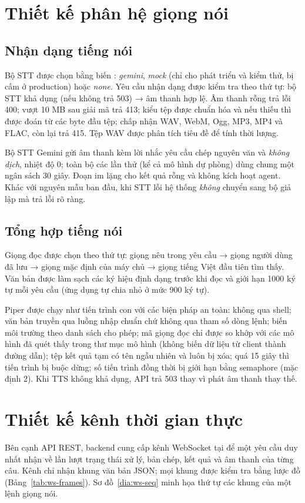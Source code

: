 \section{Thiết kế phân hệ giọng nói}
\subsection{Nhận dạng tiếng nói}
Bộ STT được chọn bằng biến : \textit{gemini}, \textit{mock} (chỉ cho phát triển và kiểm thử, bị cấm ở production) hoặc \textit{none}. Yêu cầu nhận dạng được kiểm tra theo thứ tự: bộ STT khả dụng (nếu không trả 503) → âm thanh hợp lệ. Âm thanh rỗng trả lỗi 400; vượt 10 MB sau giải mã trả 413; kiểu tệp được chuẩn hóa và nếu thiếu thì được đoán từ các byte đầu tệp; chấp nhận WAV, WebM, Ogg, MP3, MP4 và FLAC, còn lại trả 415. Tệp WAV được phân tích tiêu đề để tính thời lượng.

Bộ STT Gemini gửi âm thanh kèm lời nhắc yêu cầu chép nguyên văn và \textit{không dịch}, nhiệt độ 0; toàn bộ các lần thử (kể cả mô hình dự phòng) dùng chung một ngân sách 30 giây. Đoạn im lặng cho kết quả rỗng và không kích hoạt agent. Khác với nguyên mẫu ban đầu, khi STT lỗi hệ thống \textit{không} chuyển sang bộ giả lập mà trả lỗi rõ ràng.

\subsection{Tổng hợp tiếng nói}
Giọng đọc được chọn theo thứ tự: giọng nêu trong yêu cầu → giọng người dùng đã lưu → giọng mặc định của máy chủ → giọng tiếng Việt đầu tiên tìm thấy. Văn bản được làm sạch các ký hiệu định dạng trước khi đọc và giới hạn 1000 ký tự mỗi yêu cầu (ứng dụng tự chia nhỏ ở mức 900 ký tự).

Piper được chạy như tiến trình con với các biện pháp an toàn: không qua shell; văn bản truyền qua luồng nhập chuẩn chứ không qua tham số dòng lệnh; biến môi trường theo danh sách cho phép; mã giọng đọc chỉ được so khớp với các mô hình đã quét thấy trong thư mục mô hình (không biến dữ liệu từ client thành đường dẫn); tệp kết quả tạm có tên ngẫu nhiên và luôn bị xóa; quá 15 giây thì tiến trình bị buộc dừng; số tiến trình đồng thời bị giới hạn bằng semaphore (mặc định 2). Khi TTS không khả dụng, API trả 503 thay vì phát âm thanh thay thế.

\section{Thiết kế kênh thời gian thực}\label{sec:realtime-design}
Bên cạnh API REST, backend cung cấp kênh WebSocket tại  để một yêu cầu duy nhất nhận về lần lượt trạng thái xử lý, bản chép, kết quả và âm thanh của từng câu. Kênh chỉ nhận khung văn bản JSON; mọi khung được kiểm tra bằng lược đồ (Bảng~\ref{tab:ws-frames}). Sơ đồ~\ref{dia:ws-seq} minh họa thứ tự các khung của một lệnh giọng nói.

